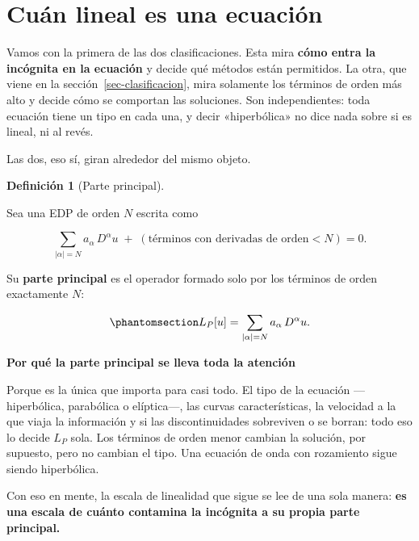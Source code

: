 \documentclass[
  spanish,
  a4paper,
]{scrbook}
\theoremstyle{definition}
\newtheorem{definition}{Definición}[chapter]
\theoremstyle{plain}
\theoremstyle{definition}
\theoremstyle{plain}
\theoremstyle{definition}
\theoremstyle{remark}
\begin{document}
\section{Cuán lineal es una ecuación}\label{sec-linealidad}

Vamos con la primera de las dos clasificaciones. Esta mira \textbf{cómo
entra la incógnita en la ecuación} y decide qué métodos están
permitidos. La otra, que viene en la sección~\ref{sec-clasificacion},
mira solamente los términos de orden más alto y decide cómo se comportan
las soluciones. Son independientes: toda ecuación tiene un tipo en cada
una, y decir «hiperbólica» no dice nada sobre si es lineal, ni al revés.

Las dos, eso sí, giran alrededor del mismo objeto.

\begin{definition}[Parte
principal]\protect\hypertarget{def-parte-principal}{}\label{def-parte-principal}

Sea una EDP de orden \(N\) escrita como

\[
\sum_{|\alpha| = N} a_\alpha\, D^\alpha u \;+\; (\text{términos con derivadas de orden} < N) = 0 .
\]

Su \textbf{parte principal} es el operador formado solo por los términos
de orden exactamente \(N\):

\begin{equation}\protect\phantomsection\label{eq-parte-principal}{
L_P[u] = \sum_{|\alpha| = N} a_\alpha\, D^\alpha u .
}\end{equation}

\end{definition}

\begin{tcolorbox}[enhanced jigsaw, arc=.35mm, bottomrule=.15mm, breakable, colback=white, colframe=quarto-callout-important-color-frame, left=2mm, leftrule=.75mm, opacityback=0, rightrule=.15mm, toprule=.15mm]
\begin{minipage}[t]{5.5mm}
\textcolor{quarto-callout-important-color}{\faExclamation}
\end{minipage}%
\begin{minipage}[t]{\textwidth - 5.5mm}

\vspace{-3mm}\textbf{Por qué la parte principal se lleva toda la atención}\vspace{3mm}

Porque es la única que importa para casi todo. El tipo de la ecuación
---hiperbólica, parabólica o elíptica---, las curvas características, la
velocidad a la que viaja la información y si las discontinuidades
sobreviven o se borran: todo eso lo decide \(L_P\) sola. Los términos de
orden menor cambian la solución, por supuesto, pero no cambian el tipo.
Una ecuación de onda con rozamiento sigue siendo hiperbólica.

Con eso en mente, la escala de linealidad que sigue se lee de una sola
manera: \textbf{es una escala de cuánto contamina la incógnita a su
propia parte principal.}

\end{minipage}%
\end{tcolorbox}
\end{document}
